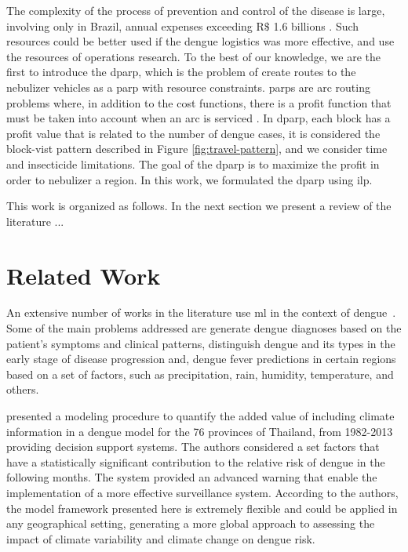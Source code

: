 \documentclass[a4paper,11pt]{article}
\begin{document}
The complexity of the process of prevention and control of the disease is large,
involving  only  in  Brazil,  annual   expenses  exceeding  R$\$$  1.6  billions
\citep{negreiros-2020}.  Such  resources could  be  better  used if  the  dengue
logistics was more  effective, and use the resources of  operations research. To
the best of our knowledge, we are  the first to introduce the \gls{dparp}, which
is the problem of  create routes to the nebulizer vehicles  as a \gls{parp} with
resource constraints. \gls{parp}s are arc routing problems where, in addition to
the cost functions, there  is a profit function that must  be taken into account
when an  arc is serviced  \citep{araoz:2006}. In  \gls{dparp}, each block  has a
profit value that is related to the number of dengue cases, it is considered the
block-vist pattern described in Figure \ref{fig:travel-pattern}, and we consider
time and insecticide limitations. The goal of the \gls{dparp} is to maximize the
profit  in  order  to nebulizer  a  region.  In  this  work, we  formulated  the
\gls{dparp} using \gls{ilp}.

This work is  organized as follows. In  the next section we present  a review of
the literature ...


\section{Related Work} \label{sec:related-work}

An extensive number  of works in the  literature use \gls{ml} in  the context of
dengue~\citep{shakurat:2015,shakil:2015,hair:2019,sarma:2020,appice:2020}. Some
of  the main  problems  addressed are  generate dengue  diagnoses  based on  the
patient's symptoms  and clinical patterns,  distinguish dengue and its  types in
the early stage of disease progression  and, dengue fever predictions in certain
regions  based on  a  set of  factors, such  as  precipitation, rain,  humidity,
temperature, and others.

\cite{lowe:2015} presented a  modeling procedure to quantify the  added value of
including  climate  information in  a  dengue  model  for  the 76  provinces  of
Thailand,  from  1982-2013  providing  decision  support  systems.  The  authors
considered a set  factors that have a statistically  significant contribution to
the relative  risk of  dengue in  the following months.  The system  provided an
advanced warning that enable the implementation of a more effective surveillance
system.  According  to  the  authors,  the model  framework  presented  here  is
extremely flexible and could be  applied in any geographical setting, generating
a  more global  approach  to assessing  the impact  of  climate variability  and
climate change on dengue risk.
\end{document}

